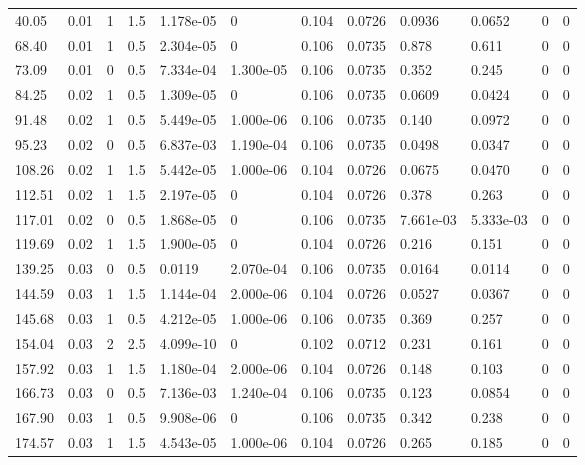 \documentclass[preview]{standalone}
\begin{document}
{{\begin{tabular}{L{1.2cm}C{1.2cm} C{0.3cm}C{0.5cm} C{1.4cm}C{1.4cm} C{1.4cm}C{1.4cm} C{1.6cm}C{1.6cm} C{1.6cm}C{1.6cm}}
  40.05  &  0.01  & 1     & 1.5 &  1.178e-05  & 0  &  0.104&   0.0726& 0.0936 & 0.0652   &  0 & 0  \\ 
  68.40  &  0.01  & 1     & 0.5 &  2.304e-05  & 0  &  0.106&   0.0735& 0.878 & 0.611   &  0 & 0  \\ 
  73.09  &  0.01  & 0     & 0.5 &  7.334e-04  & 1.300e-05  &  0.106&   0.0735& 0.352 & 0.245   &  0 & 0  \\ 
  84.25  &  0.02  & 1     & 0.5 &  1.309e-05  & 0  &  0.106&   0.0735& 0.0609 & 0.0424   &  0 & 0  \\ 
  91.48  &  0.02  & 1     & 0.5 &  5.449e-05  & 1.000e-06  &  0.106&   0.0735& 0.140 & 0.0972   &  0 & 0  \\ 
  95.23  &  0.02  & 0     & 0.5 &  6.837e-03  & 1.190e-04  &  0.106&   0.0735& 0.0498 & 0.0347   &  0 & 0  \\ 
  108.26  &  0.02  & 1     & 1.5 &  5.442e-05  & 1.000e-06  &  0.104&   0.0726& 0.0675 & 0.0470   &  0 & 0  \\ 
  112.51  &  0.02  & 1     & 1.5 &  2.197e-05  & 0  &  0.104&   0.0726& 0.378 & 0.263   &  0 & 0  \\ 
  117.01  &  0.02  & 0     & 0.5 &  1.868e-05  & 0  &  0.106&   0.0735& 7.661e-03 & 5.333e-03   &  0 & 0  \\ 
  119.69  &  0.02  & 1     & 1.5 &  1.900e-05  & 0  &  0.104&   0.0726& 0.216 & 0.151   &  0 & 0  \\ 
  139.25  &  0.03  & 0     & 0.5 &  0.0119  & 2.070e-04  &  0.106&   0.0735& 0.0164 & 0.0114   &  0 & 0  \\ 
  144.59  &  0.03  & 1     & 1.5 &  1.144e-04  & 2.000e-06  &  0.104&   0.0726& 0.0527 & 0.0367   &  0 & 0  \\ 
  145.68  &  0.03  & 1     & 0.5 &  4.212e-05  & 1.000e-06  &  0.106&   0.0735& 0.369 & 0.257   &  0 & 0  \\ 
  154.04  &  0.03  & 2     & 2.5 &  4.099e-10  & 0  &  0.102&   0.0712& 0.231 & 0.161   &  0 & 0  \\ 
  157.92  &  0.03  & 1     & 1.5 &  1.180e-04  & 2.000e-06  &  0.104&   0.0726& 0.148 & 0.103   &  0 & 0  \\ 
  166.73  &  0.03  & 0     & 0.5 &  7.136e-03  & 1.240e-04  &  0.106&   0.0735& 0.123 & 0.0854   &  0 & 0  \\ 
  167.90  &  0.03  & 1     & 0.5 &  9.908e-06  & 0  &  0.106&   0.0735& 0.342 & 0.238   &  0 & 0  \\ 
  174.57  &  0.03  & 1     & 1.5 &  4.543e-05  & 1.000e-06  &  0.104&   0.0726& 0.265 & 0.185   &  0 & 0  \\ 

\end{tabular}}}
\end{document}
